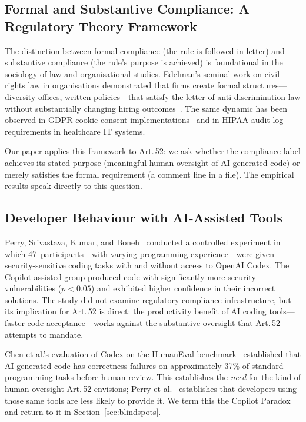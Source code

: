 \documentclass[conference]{IEEEtran}
\begin{document}
\subsection{Formal and Substantive Compliance: A Regulatory Theory Framework}

The distinction between formal compliance (the rule is followed in
letter) and substantive compliance (the rule's purpose is achieved) is
foundational in the sociology of law and organisational studies.
Edelman's seminal work on civil rights law in organisations demonstrated
that firms create formal structures---diversity offices, written
policies---that satisfy the letter of anti-discrimination law without
substantially changing hiring outcomes~\cite{edelman1992}.  The same
dynamic has been observed in GDPR cookie-consent
implementations~\cite{machuletz2020} and in HIPAA audit-log requirements
in healthcare IT systems.

Our paper applies this framework to Art.\,52: we ask whether the
compliance label achieves its stated purpose (meaningful human oversight
of AI-generated code) or merely satisfies the formal requirement (a
comment line in a file).  The empirical results speak directly to this
question.

\subsection{Developer Behaviour with AI-Assisted Tools}

Perry, Srivastava, Kumar, and Boneh~\cite{perry2023} conducted a
controlled experiment in which 47~participants---with varying programming
experience---were given security-sensitive coding tasks with and without
access to OpenAI Codex.  The Copilot-assisted group produced code with
significantly more security vulnerabilities ($p < 0.05$) and exhibited
higher confidence in their incorrect solutions.  The study did not
examine regulatory compliance infrastructure, but its implication for
Art.\,52 is direct: the productivity benefit of AI coding tools---faster
code acceptance---works against the substantive oversight that Art.\,52
attempts to mandate.

Chen et al.'s evaluation of Codex on the HumanEval benchmark~\cite{chen2021}
established that AI-generated code has correctness failures on
approximately 37\% of standard programming tasks before human review.
This establishes the \emph{need} for the kind of human oversight
Art.\,52 envisions; Perry et al.~\cite{perry2023} establishes that
developers using those same tools are less likely to provide it.  We
term this the Copilot Paradox and return to it in
Section~\ref{sec:blindspots}.
\end{document}
